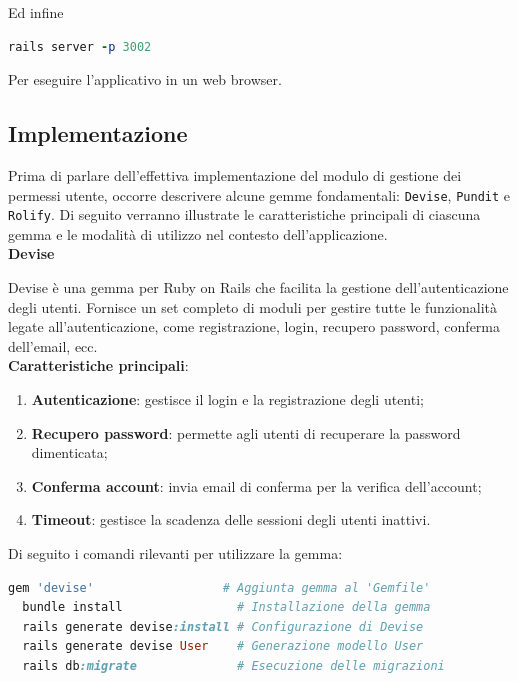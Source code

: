\documentclass[a4paper, 12pt]{book}
\begin{document}
Ed infine

\begin{lstlisting}[language=ruby, caption=Avviamento del progetto]
  rails server -p 3002
  \end{lstlisting}

Per eseguire l'applicativo in un web browser.

\newpage

\subsection{Implementazione}

Prima di parlare dell'effettiva implementazione del modulo di gestione dei permessi utente, occorre descrivere alcune gemme
fondamentali: \texttt{Devise}, \texttt{Pundit} e \texttt{Rolify}. Di seguito verranno illustrate le caratteristiche principali
di ciascuna gemma e le modalità di utilizzo nel contesto dell'applicazione.\\

\textbf{Devise}

Devise \cite{Devise} è una gemma per Ruby on Rails che facilita la gestione dell'autenticazione
degli utenti. Fornisce un set completo di moduli per gestire tutte le funzionalità legate all'autenticazione,
come registrazione, login, recupero password, conferma dell'email, ecc.\\

\textbf{Caratteristiche principali}:

\begin{enumerate}
  \item \textbf{Autenticazione}: gestisce il login e la registrazione degli utenti;
  \item \textbf{Recupero password}: permette agli utenti di recuperare la password dimenticata;
  \item \textbf{Conferma account}: invia email di conferma per la verifica dell'account;
  \item \textbf{Timeout}: gestisce la scadenza delle sessioni degli utenti inattivi.
\end{enumerate}

Di seguito i comandi rilevanti per utilizzare la gemma:\\

\begin{lstlisting}[language=ruby, caption=Utilizzo di Devise]
  gem 'devise'                  # Aggiunta gemma al 'Gemfile'
  bundle install                # Installazione della gemma
  rails generate devise:install # Configurazione di Devise
  rails generate devise User    # Generazione modello User
  rails db:migrate              # Esecuzione delle migrazioni
  \end{lstlisting}
\end{document}
